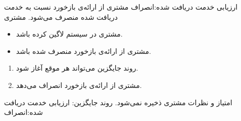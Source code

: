 \alternativeflow
{
ارزیابی خدمت دریافت شده:انصراف
}
{}
{
مشتری از ارائه‌ی بازخورد نسبت به خدمت دریافت شده منصرف می‌شود.
}
{
	مشتری
}
{}
{
	\begin{itemize}
		\vspace*{-0.6cm}
		\item 
		مشتری در سیستم لاگین کرده باشد.
		\item
		مشتری از ارائه‌ی بازخورد منصرف شده باشد.
	\end{itemize}
}
{
	\vspace*{-0.6cm}
	\begin{enumerate}
		\item 
		روند جایگزین می‌تواند هر موقع آغاز شود.
		\item
		مشتری از ارائه‌ی بازخورد انصراف می‌دهد.
	\end{enumerate}
}
{
امتیاز و نظرات مشتری ذخیره نمی‌شود.
}
{
روند جایگزین: ارزیابی خدمت دریافت شده:انصراف
}




